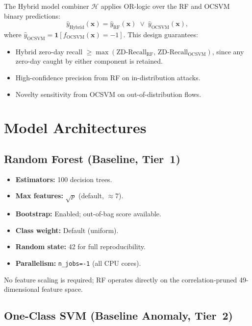 \documentclass[10pt,conference]{IEEEtran}
\begin{document}
The Hybrid model combiner $\mathcal{H}$ applies OR-logic over the RF
and OCSVM binary predictions:
\begin{equation}
  \hat{y}_{\text{Hybrid}}(\mathbf{x})
  = \hat{y}_{\text{RF}}(\mathbf{x}) \;\mathbin{\vee}\;
    \hat{y}_{\text{OCSVM}}(\mathbf{x}),
  \label{eq:hybrid}
\end{equation}
where $\hat{y}_{\text{OCSVM}} = \mathbf{1}[f_{\text{OCSVM}}(\mathbf{x}) = -1]$.
This design guarantees:
\begin{itemize}[leftmargin=*,noitemsep]
  \item Hybrid zero-day recall $\geq \max(\text{ZD-Recall}_\text{RF},\,
        \text{ZD-Recall}_\text{OCSVM})$, since any zero-day caught by
        either component is retained.
  \item High-confidence precision from RF on in-distribution attacks.
  \item Novelty sensitivity from OCSVM on out-of-distribution flows.
\end{itemize}

\section{Model Architectures}
\label{sec:architectures}

\subsection{Random Forest (Baseline, Tier~1)}

\begin{itemize}[leftmargin=*,noitemsep]
  \item \textbf{Estimators:} 100 decision trees.
  \item \textbf{Max features:} $\sqrt{p}$ (default, $\approx7$).
  \item \textbf{Bootstrap:} Enabled; out-of-bag score available.
  \item \textbf{Class weight:} Default (uniform).
  \item \textbf{Random state:} 42 for full reproducibility.
  \item \textbf{Parallelism:} \texttt{n\_jobs=-1} (all CPU cores).
\end{itemize}

No feature scaling is required; RF operates directly on the
correlation-pruned 49-dimensional feature space.

\subsection{One-Class SVM (Baseline Anomaly, Tier~2)}
\end{document}
